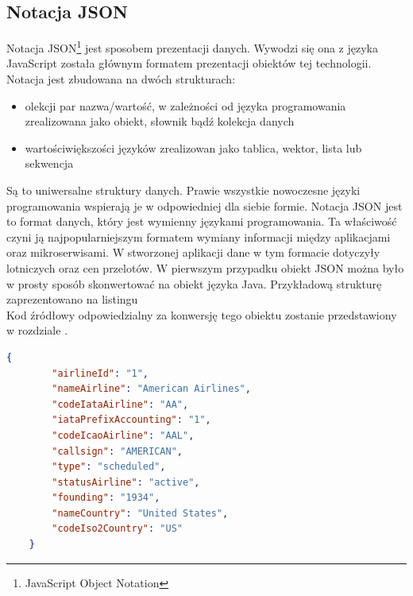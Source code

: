 \documentclass[12pt, twoside]{report}
\begin{document}
\subsection{Notacja JSON}
Notacja JSON\footnote{JavaScript Object Notation} jest  sposobem prezentacji danych.  Wywodzi się ona z języka JavaScript została głównym formatem prezentacji obiektów tej technologii. Notacja  jest zbudowana na dwóch strukturach:
\begin{itemize}[noitemsep,topsep=0pt]
\item {}olekcji par nazwa/wartość, w zależności od języka programowania zrealizowana jako obiekt, słownik bądź kolekcja danych\add{,}
\item {} wartościwiększości języków zrealizowan jako tablica, wektor, lista lub sekwencja
\end{itemize}
Są to uniwersalne struktury danych. Prawie wszystkie nowoczesne języki programowania wspierają je w odpowiedniej dla siebie formie. Notacja JSON jest to format danych, który jest wymienny  językami programowania. Ta właściwość czyni ją najpopularniejszym formatem wymiany informacji między aplikacjami oraz mikroserwisami\cite{json}. W stworzonej aplikacji dane w tym formacie dotyczyły  lotniczych oraz cen przelotów. W pierwszym przypadku obiekt JSON można było w prosty sposób skonwertować na obiekt języka Java. Przykładową strukturę zaprezentowano na listingu \\
Kod źródłowy odpowiedzialny za konwersję tego obiektu zostanie przedstawiony w rozdziale .
\begin{lstlisting}[language=JSON, caption= Przykładowy obiekt w notacji JSON]
    {
        "airlineId": "1",
        "nameAirline": "American Airlines",
        "codeIataAirline": "AA",
        "iataPrefixAccounting": "1",
        "codeIcaoAirline": "AAL",
        "callsign": "AMERICAN",
        "type": "scheduled",
        "statusAirline": "active",
        "founding": "1934",
        "nameCountry": "United States",
        "codeIso2Country": "US"
    }
\end{lstlisting}
\end{document}
